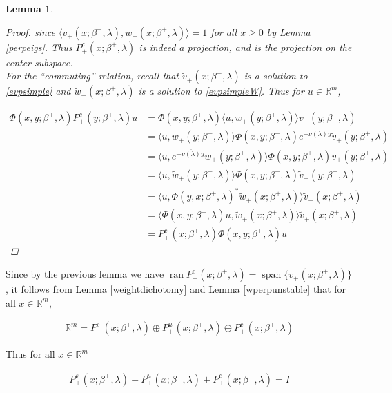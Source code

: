 \documentclass[12pt]{article}
\def\R{{\mathbb R}}
\DeclareMathOperator{\spn}{span}
\DeclareMathOperator{\ran}{ran}
\newtheorem{lemma}{Lemma}
\begin{document}
\begin{lemma}
\begin{proof}
since $\langle v_+(x; \beta^+, \lambda), w_+(x; \beta^+, \lambda) \rangle = 1$ for all $x \geq 0$ by Lemma \ref{perpeigs}. Thus $P^c_+(x; \beta^+, \lambda)$ is indeed a projection, and is the projection on the center subspace.\\

For the ``commuting'' relation, recall that $\tilde{v}_+(x; \beta^+, \lambda)$ is a solution to \eqref{evpsimple} and $\tilde{w}_+(x; \beta^+, \lambda)$ is a solution to \eqref{evpsimpleW}. Thus for $u \in \R^m$,

\begin{align*}
\Phi(x, y; \beta^+, \lambda) P^c_+(y; \beta^+, \lambda) u 
&= \Phi(x, y; \beta^+, \lambda) \langle u, w_+(y; \beta^+, \lambda) \rangle v_+(y; \beta^+, \lambda)\\
&= \langle u, w_+(y; \beta^+, \lambda) \rangle \Phi(x, y; \beta^+, \lambda) e^{-\nu(\lambda)y} \tilde{v}_+(y; \beta^+, \lambda)\\
&= \langle u, e^{-\overline{\nu(\lambda)}y}w_+(y; \beta^+, \lambda) \rangle \Phi(x, y; \beta^+, \lambda) \tilde{v}_+(y; \beta^+, \lambda)\\
&= \langle u, \tilde{w}_+(y; \beta^+, \lambda) \rangle \Phi(x, y; \beta^+, \lambda) \tilde{v}_+(y; \beta^+, \lambda)\\
&= \langle u, \Phi(y, x; \beta^+, \lambda)^* \tilde{w}_+(x; \beta^+, \lambda) \rangle \tilde{v}_+(x; \beta^+, \lambda)\\
&= \langle \Phi(x, y; \beta^+, \lambda) u, \tilde{w}_+(x; \beta^+, \lambda) \rangle \tilde{v}_+(x; \beta^+, \lambda)\\
&= P^c_+(x; \beta^+, \lambda) \Phi(x, y; \beta^+, \lambda) u
\end{align*}

\end{proof}
\end{lemma}

Since by the previous lemma we have $\ran P^c_+(x; \beta^+, \lambda) = \spn \{ v_+(x; \beta^+, \lambda) \}$, it follows from Lemma \ref{weightdichotomy} and Lemma \ref{wperpunstable} that for all $x \in \R^m$,

\begin{align*}
\R^m = P^s_+(x; \beta^+, \lambda) \oplus P^u_+(x; \beta^+, \lambda) \oplus P^c_+(x; \beta^+, \lambda)
\end{align*}

Thus for all $x \in \R^m$

\begin{align*}
P^s_+(x; \beta^+, \lambda) + P^u_+(x; \beta^+, \lambda) + P^c_+(x; \beta^+, \lambda) = I
\end{align*}
\end{document}
